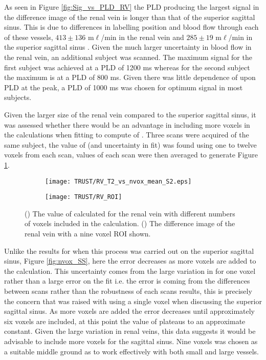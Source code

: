 \newpage
As seen in Figure \ref{fig:Sig_vs_PLD_RV} the \ac{PLD} producing the largest signal in the difference image of the renal vein is longer than that of the superior sagittal sinus. This is due to differences in labelling position and blood flow through each of these vessels, $413\pm136$ m$\ell$/min in the renal vein \cite{cox_multiparametric_2017} and $285\pm19$ m$\ell$/min in the superior sagittal sinus \cite{jordan_velocity_1994}. Given the much larger uncertainty in blood flow in the renal vein, an additional subject was scanned. The maximum signal for the first subject was achieved at a \ac{PLD} of 1200 ms whereas for the second subject the maximum is at a \ac{PLD} of 800 ms. Given there was little dependence of \ttwo upon \ac{PLD} at the peak, a \ac{PLD} of 1000 ms was chosen for optimum signal in most subjects.

Given the larger size of the renal vein compared to the superior sagittal sinus, it was assessed whether there would be an advantage in including more voxels in the calculations when fitting to compute of \ttwo. Three scans were acquired of the same subject, the value of \ttwo (and uncertainty in fit) was found using one to twelve voxels from each scan, \ttwo values of each scan were then averaged to generate Figure \ref{fig:nvox_RV}.  

\begin{figure}[H]
	\centering
	\begin{subfigure}[c]{0.47\textwidth}
		\centering
		\texttt{[image: TRUST/RV\_T2\_vs\_nvox\_mean\_S2.eps]}
		\caption{}
		\label{fig:nvox_RV}
	\end{subfigure}
	\hfill
	\begin{subfigure}[c]{0.47\textwidth}
		\centering
		\texttt{[image: TRUST/RV\_ROI]}
		\caption{}
		\label{fig:RV_ROI}
	\end{subfigure}
	\caption{() The value of \ttwo calculated for the renal vein with different numbers of voxels included in the calculation. () The difference image of the renal vein with a nine voxel \ac{ROI} shown.}
	\label{fig:nv_RV}
\end{figure}


Unlike the results for when this process was carried out on the superior sagittal sinus, Figure \ref{fig:nvox_SS}, here the error decreases as more voxels are added to the calculation. This uncertainty comes from the large variation in \ttwo for one voxel rather than a large error on the fit i.e. the error is coming from the differences between scans rather than the robustness of each scans results, this is precisely the concern that was raised with using a single voxel when discussing the superior sagittal sinus. As more voxels are added the error decreases until approximately six voxels are included, at this point the value of \ttwo plateaus to an approximate constant. Given the large variation in renal veins, this data suggests it would be advisable to include more voxels for the sagittal sinus. Nine voxels was chosen as a suitable middle ground as to work effectively with both small and large vessels.

